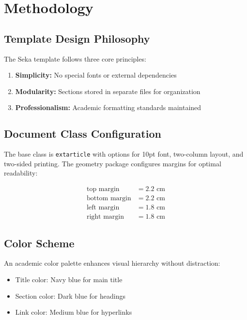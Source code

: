 \section{Methodology}\label{sec:methodology}

\subsection{Template Design Philosophy}

The Seka template follows three core principles:

\begin{enumerate}
    \item \textbf{Simplicity:} No special fonts or external dependencies
    \item \textbf{Modularity:} Sections stored in separate files for organization
    \item \textbf{Professionalism:} Academic formatting standards maintained
\end{enumerate}

\subsection{Document Class Configuration}

The base class is \texttt{extarticle} with options for 10pt font, two-column layout, and two-sided printing. The geometry package configures margins for optimal readability:

\begin{equation}\label{eq:margins}
\begin{aligned}
\text{top margin} &= 2.2 \text{ cm} \\
\text{bottom margin} &= 2.2 \text{ cm} \\
\text{left margin} &= 1.8 \text{ cm} \\
\text{right margin} &= 1.8 \text{ cm}
\end{aligned}
\end{equation}

\subsection{Color Scheme}

An academic color palette enhances visual hierarchy without distraction:

\begin{itemize}
    \item \textcolor{titlecolor}{Title color: Navy blue} for main title
    \item \textcolor{sectioncolor}{Section color: Dark blue} for headings
    \item \textcolor{linkcolor}{Link color: Medium blue} for hyperlinks
\end{itemize}

